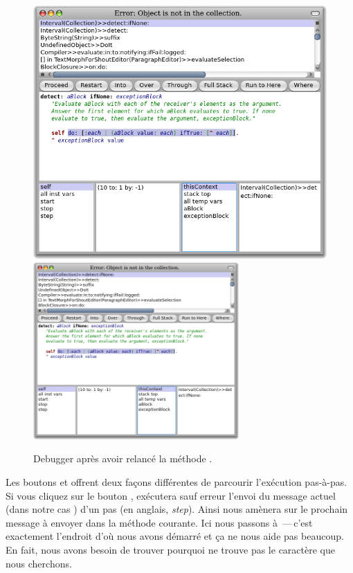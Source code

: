 \documentclass[a4paper,10pt,twoside]{book}
\begin{document}
\begin{figure}[btp]
	\begin{center}
	\ifluluelse
		{\includegraphics[width=\textwidth]{RestartDetectIfNone}}
		{\includegraphics[width=0.7\textwidth]{RestartDetectIfNone}}
	\end{center}
	\caption{Debugger après avoir relancé la méthode .}
\end{figure}

Les boutons  et  offrent deux façons différentes de 
parcourir l'exécution pas-à-pas.
Si vous cliquez sur le bouton , \pharo exécutera sauf erreur
l'envoi du message actuel (dans notre cas ) d'un pas (en anglais, \emph{step}).
Ainsi  nous amènera sur 
le prochain message à envoyer dans la méthode courante. Ici nous
passons à \,---\,c'est exactement l'endroit d'où nous avons démarré
et ça ne nous aide pas beaucoup.
En fait, nous avons besoin de trouver pourquoi  ne trouve pas
le caractère que nous cherchons.
\end{document}
